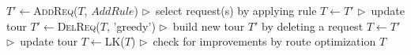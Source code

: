 	\begin{algorithmic}[1]
		\State $T' \leftarrow$\textsc{AddReq($T$, $AddRule$)} {\hfill \small \hspace{.6cm}$\triangleright \,$ select request(s) by applying rule}
		\State $T \leftarrow T'$ {\hfill \small \hspace{.6cm}$\triangleright \,$ update tour}
		\EndIf
		\State $T' \leftarrow$\textsc{DelReq}($T$, 'greedy') {\hfill \small \hspace{.6cm}$\triangleright \,$ build new tour $T'$ by deleting a request}
		\State $T \leftarrow T'$ {\hfill \small \hspace{.6cm}$\triangleright \,$ update tour}
		\EndIf
		\State $T \leftarrow$\textsc{LK($T$)} {\hfill \small \hspace{.6cm}$\triangleright \,$ check for improvements by route optimization}
		\State 	\Return $T$ 
		\EndProcedure
	\end{algorithmic}
